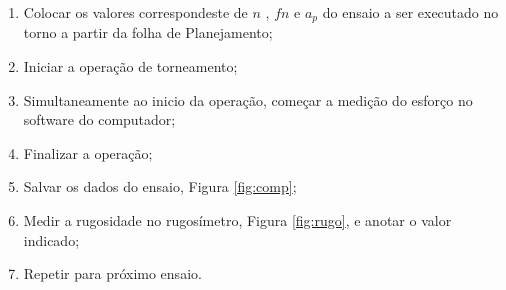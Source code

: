 \documentclass[deposito, acronym, symbols]{fei}
\begin{document}
\begin{enumerate}
    \item Colocar os valores correspondeste de $n$ , $fn$ e $a_p$ do ensaio a ser executado no torno a partir da folha de Planejamento;
    \item Iniciar a operação de torneamento;
    \item Simultaneamente ao inicio da operação, começar a medição do esforço no software do computador;
    \item Finalizar a operação;
    \item Salvar os dados do ensaio, Figura \ref{fig:comp};
    \item Medir a rugosidade no rugosímetro, Figura \ref{fig:rugo}, e anotar o valor indicado;
    \item Repetir para próximo ensaio.
\end{enumerate}
\end{document}

